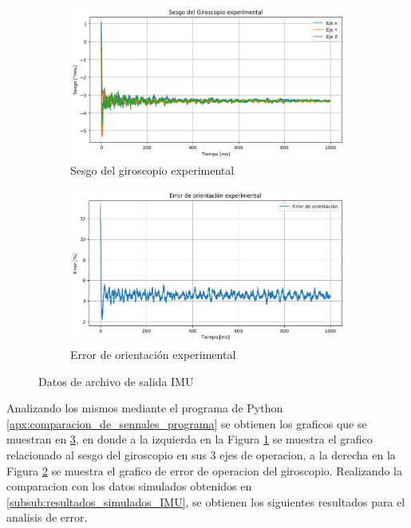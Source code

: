 \begin{figure}[htbp]
    \centering
    \begin{subfigure}[b]{0.35\textwidth}
        \centering
        \includegraphics[width=\textwidth]{fig/Capitulo5/Caso_de_estudio_IMU/data/experimental/sesgo_experimental.png}
        \caption{Sesgo del giroscopio experimental}
        \label{fig:imu_sesgo_exp}
    \end{subfigure}
    \hfill
    \begin{subfigure}[b]{0.45\textwidth}
        \centering
        \includegraphics[width=\textwidth]{fig/Capitulo5/Caso_de_estudio_IMU/data/experimental/error_de_orientacion.png}
        \caption{Error de orientación experimental}
        \label{fig:out_files_IMU_eo_exp}
    \end{subfigure}
    \caption{Datos de archivo de salida IMU}
    \label{fig:IMU_ZEDBOARD_exp}
\end{figure}

Analizando los mismos mediante el programa de Python \ref{apx:comparacion_de_sennales_programa} se obtienen los graficos que se muestran en \ref{fig:IMU_ZEDBOARD_exp}, en donde a la izquierda en la Figura \ref{fig:imu_sesgo_exp} se muestra el grafico relacionado al sesgo del giroscopio en sus 3 ejes de operacion, a la derecha en la Figura \ref{fig:out_files_IMU_eo_exp} se muestra el grafico de error de operacion del giroscopio. Realizando la comparacion con los datos simulados obtenidos en \ref{subsub:resultados_simulados_IMU}, se obtienen los siguientes resultados para el analisis de error.

